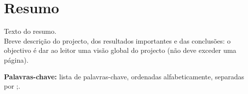 \cleardoublepage\newpage
\chapter*{Resumo} \label{resumo}
Texto do resumo.\\

Breve descrição do projecto, dos resultados importantes e das conclusões: o objectivo é dar ao leitor uma visão global do projecto (não deve exceder uma página). 

{\bf Palavras-chave:} lista de palavras-chave, ordenadas alfabeticamente, separadas por ;.